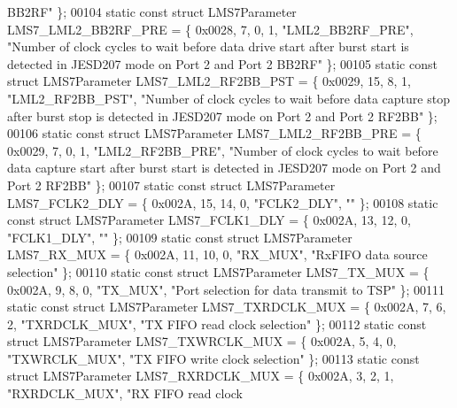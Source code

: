 \begin{DoxyCode}
{       BB2RF"} \};
00104 \textcolor{keyword}{static} \textcolor{keyword}{const} \textcolor{keyword}{struct }LMS7Parameter LMS7_LML2_BB2RF_PRE = \{ 0x0028, 7, 0, 1, \textcolor{stringliteral}{"LML2\_BB2RF\_PRE"}, \textcolor{stringliteral}{"Number of
       clock cycles to wait before data drive start after burst start is detected in JESD207 mode on Port 2 and Port 2
       BB2RF"} \};
00105 \textcolor{keyword}{static} \textcolor{keyword}{const} \textcolor{keyword}{struct }LMS7Parameter LMS7_LML2_RF2BB_PST = \{ 0x0029, 15, 8, 1, \textcolor{stringliteral}{"LML2\_RF2BB\_PST"}, \textcolor{stringliteral}{"Number of
       clock cycles to wait before data capture stop after burst stop is detected in JESD207 mode on Port 2 and Port
       2 RF2BB"} \};
00106 \textcolor{keyword}{static} \textcolor{keyword}{const} \textcolor{keyword}{struct }LMS7Parameter LMS7_LML2_RF2BB_PRE = \{ 0x0029, 7, 0, 1, \textcolor{stringliteral}{"LML2\_RF2BB\_PRE"}, \textcolor{stringliteral}{"Number of
       clock cycles to wait before data capture start after burst start is detected in JESD207 mode on Port 2 and Port
       2 RF2BB"} \};
00107 \textcolor{keyword}{static} \textcolor{keyword}{const} \textcolor{keyword}{struct }LMS7Parameter LMS7_FCLK2_DLY = \{ 0x002A, 15, 14, 0, \textcolor{stringliteral}{"FCLK2\_DLY"}, \textcolor{stringliteral}{""} \};
00108 \textcolor{keyword}{static} \textcolor{keyword}{const} \textcolor{keyword}{struct }LMS7Parameter LMS7_FCLK1_DLY = \{ 0x002A, 13, 12, 0, \textcolor{stringliteral}{"FCLK1\_DLY"}, \textcolor{stringliteral}{""} \};
00109 \textcolor{keyword}{static} \textcolor{keyword}{const} \textcolor{keyword}{struct }LMS7Parameter LMS7_RX_MUX = \{ 0x002A, 11, 10, 0, \textcolor{stringliteral}{"RX\_MUX"}, \textcolor{stringliteral}{"RxFIFO data source
       selection"} \};
00110 \textcolor{keyword}{static} \textcolor{keyword}{const} \textcolor{keyword}{struct }LMS7Parameter LMS7_TX_MUX = \{ 0x002A, 9, 8, 0, \textcolor{stringliteral}{"TX\_MUX"}, \textcolor{stringliteral}{"Port selection for data
       transmit to TSP"} \};
00111 \textcolor{keyword}{static} \textcolor{keyword}{const} \textcolor{keyword}{struct }LMS7Parameter LMS7_TXRDCLK_MUX = \{ 0x002A, 7, 6, 2, \textcolor{stringliteral}{"TXRDCLK\_MUX"}, \textcolor{stringliteral}{"TX FIFO read clock
       selection"} \};
00112 \textcolor{keyword}{static} \textcolor{keyword}{const} \textcolor{keyword}{struct }LMS7Parameter LMS7_TXWRCLK_MUX = \{ 0x002A, 5, 4, 0, \textcolor{stringliteral}{"TXWRCLK\_MUX"}, \textcolor{stringliteral}{"TX FIFO write clock
       selection"} \};
00113 \textcolor{keyword}{static} \textcolor{keyword}{const} \textcolor{keyword}{struct }LMS7Parameter LMS7_RXRDCLK_MUX = \{ 0x002A, 3, 2, 1, \textcolor{stringliteral}{"RXRDCLK\_MUX"}, \textcolor{stringliteral}{"RX FIFO read clock
}
\end{DoxyCode}
